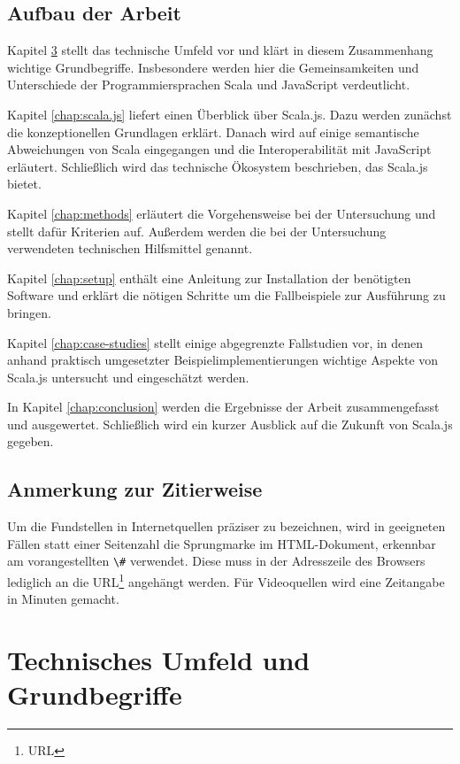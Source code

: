 \documentclass[a4paper, 12pt, hidelinks, listof=totoc, listoftables=totoc, bibliography=totoc]{scrreprt}
\newcommand{\code}[1]{\lstinline[language=Scala, style=inline]|#1|}
\begin{document}
\section{Aufbau der Arbeit}

Kapitel \ref{chap:basics} stellt das technische Umfeld vor und klärt in diesem Zusammenhang wichtige Grundbegriffe. Insbesondere werden hier die Gemeinsamkeiten und Unterschiede der Programmiersprachen Scala und JavaScript verdeutlicht.

Kapitel \ref{chap:scala.js} liefert einen Überblick über Scala.js. Dazu werden zunächst die konzeptionellen Grundlagen erklärt. Danach wird auf einige semantische Abweichungen von Scala eingegangen und die Interoperabilität mit JavaScript erläutert. Schließlich wird das technische Ökosystem beschrieben, das Scala.js bietet.

Kapitel \ref{chap:methods} erläutert die Vorgehensweise bei der Untersuchung und stellt dafür Kriterien auf. Außerdem werden die bei der Untersuchung verwendeten technischen Hilfsmittel genannt.

Kapitel \ref{chap:setup} enthält eine Anleitung zur Installation der benötigten Software und erklärt die nötigen Schritte um die Fallbeispiele zur Ausführung zu bringen.

Kapitel \ref{chap:case-studies} stellt einige abgegrenzte Fallstudien vor, in denen anhand praktisch umgesetzter Beispielimplementierungen wichtige Aspekte von Scala.js untersucht und eingeschätzt werden.

In Kapitel \ref{chap:conclusion} werden die Ergebnisse der Arbeit zusammengefasst und ausgewertet. Schließlich wird ein kurzer Ausblick auf die Zukunft von Scala.js gegeben.


\section{Anmerkung zur Zitierweise}

Um die Fundstellen in Internetquellen präziser zu bezeichnen, wird in geeigneten Fällen statt einer Seitenzahl die Sprungmarke im \ac{HTML}-Dokument, erkennbar am vorangestellten \code{\#} verwendet. Diese muss in der Adresszeile des Browsers lediglich an die URL\footnote{\ac{URL}} angehängt werden. Für Videoquellen wird eine Zeitangabe in Minuten gemacht.


\chapter{Technisches Umfeld und Grundbegriffe}\label{chap:basics}
\end{document}
